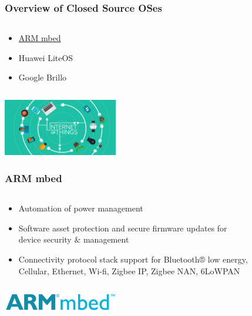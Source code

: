 \documentclass{beamer}
\begin{document}
\begin{frame}
	\frametitle{Overview of Closed Source OSes}
	\begin{columns}[c]
		\begin{column}{30cm}
			\vspace{.1cm}
			\begin{itemize}
				\justifying
				\item \textcolor{blue}{\href{https://mbed.org/}{ARM mbed}}
				\item Huawei LiteOS
				\item Google Brillo
			\end{itemize}
		\end{column}
	\end{columns}
	\vspace{.5cm}
	\hspace*{5.5cm} \includegraphics[width=5cm]{figs/Internet-of-Things-2.jpg}
\end{frame}

\begin{frame}
	\frametitle{ARM mbed}
	\begin{columns}[c]
		\begin{column}{30cm}
			\vspace{.1cm}
			\begin{itemize}
				\justifying
				\item Automation of power management
				\item Software asset protection and secure firmware updates for\\
				device security \& management
				\item Connectivity protocol stack support for Bluetooth® low energy,\\
				Cellular, Ethernet, Wi-fi, Zigbee IP, Zigbee NAN, 6LoWPAN
			\end{itemize}
		\end{column}
	\end{columns}
	\vspace{.5cm}
	\hspace*{5.5cm} \includegraphics[width=5cm]{figs/ARM-mbed-logo.png}
\end{frame}
\end{document}

